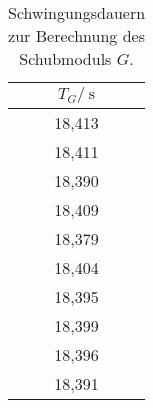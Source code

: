 \begin{table}
	\centering
	\begin{tabular}{c}
	\toprule
	{$T_G/\:\si{\second}$}\\
	\midrule
18,413\\
18,411\\
18,390\\
18,409\\
18,379\\
18,404\\
18,395\\
18,399\\
18,396\\
18,391\\
	\bottomrule
	\end{tabular}
	\caption{Schwingungsdauern zur Berechnung des Schubmoduls $G$.}
	\label{tab:T_G}
\end{table}